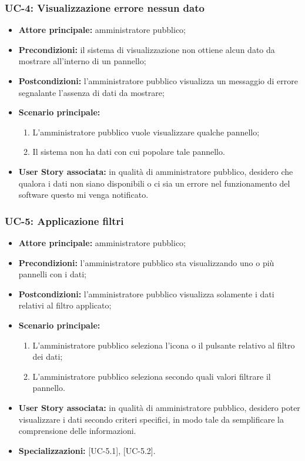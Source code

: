 \documentclass[8pt]{article}
\begin{document}
\subsubsection*{UC-4: Visualizzazione errore nessun dato}
\begin{itemize}
    \item \textbf{Attore principale:} amministratore pubblico;
    \item \textbf{Precondizioni:} il sistema di visualizzazione non ottiene alcun dato da mostrare all’interno di un pannello;
    \item \textbf{Postcondizioni:} l’amministratore pubblico visualizza un messaggio di errore segnalante l’assenza di dati da mostrare;
    \item \textbf{Scenario principale:}
        \begin{enumerate}
        \item L’amministratore pubblico vuole visualizzare qualche pannello;
        \item Il sistema non ha dati con cui popolare tale pannello.
        \end{enumerate}
    \item \textbf{User Story associata:} in qualità di amministratore pubblico, desidero che qualora
        i dati non siano disponibili o ci sia un errore nel funzionamento del software questo mi
        venga notificato.
\end{itemize}
\subsubsection*{UC-5: Applicazione filtri}
\begin{itemize}
    \item \textbf{Attore principale:} amministratore pubblico;
    \item \textbf{Precondizioni:} l’amministratore pubblico sta visualizzando uno o più pannelli con i dati;
    \item \textbf{Postcondizioni:} l’amministratore pubblico visualizza solamente i dati relativi al filtro
applicato;
    \item \textbf{Scenario principale:}
        \begin{enumerate}
        \item L’amministratore pubblico seleziona l’icona o il pulsante relativo al filtro dei dati;
        \item L’amministratore pubblico seleziona secondo quali valori filtrare il pannello.
        \end{enumerate}
    \item \textbf{User Story associata:} in qualità di amministratore pubblico, desidero poter
        visualizzare i dati secondo criteri specifici, in modo tale da semplificare la comprensione
        delle informazioni.
    \item \textbf{Specializzazioni:} [UC-5.1], [UC-5.2].
\end{itemize}
\end{document}
